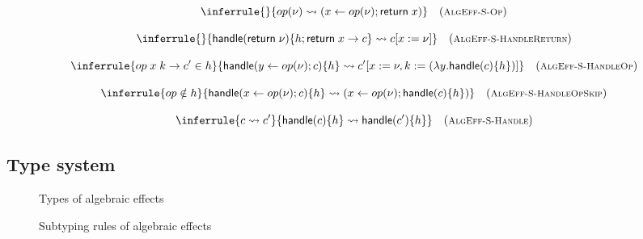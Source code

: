{\begin{figure}
{\begin{minipage}{16 cm}
\[\inferrule{
}{
	\cop{op}{\val} \rightsquigarrow (\cdo{x}{\cop{op}{\val}}{\creturn{x}})
}\quad(\footnotesize\textsc{AlgEff-S-Op})\]

\[\inferrule{
}{
	\chandle{\creturn{\val}}{h; \hreturn{x}{\comp}} \rightsquigarrow \comp[x := \val]
}\quad(\footnotesize\textsc{AlgEff-S-HandleReturn})\]

\[\inferrule{
	\hopc{op}{x}{k}{\comp'} \in h
}{
	\chandle{\cdo{y}{\cop{op}{\val}}{\comp}}{h} \rightsquigarrow \comp'[x := \val, k := (\vabs{y}{\chandle{\comp}{h}})]
}\quad(\footnotesize\textsc{AlgEff-S-HandleOp})\]

\[\inferrule{
	op \notin h
}{
	\chandle{\cdo{x}{\cop{op}{\val}}{\comp}}{h} \rightsquigarrow (\cdo{x}{\cop{op}{\val}}{\chandle{\comp}{h}})
}\quad(\footnotesize\textsc{AlgEff-S-HandleOpSkip})\]

\[\inferrule{
	\comp \rightsquigarrow \comp'
}{
	\chandle{\comp}{h} \rightsquigarrow \chandle{\comp'}{h}
}\quad(\footnotesize\textsc{AlgEff-S-Handle})\]
\label{fig:semantics-algeff}
\end{minipage}
}
\end{figure}

\subsection{Type system}

\begin{figure}
\caption{Types of algebraic effects}
\centering
{}
\end{figure}

\begin{figure}
\caption{Subtyping rules of algebraic effects}
\centering
{}
\end{figure}}
